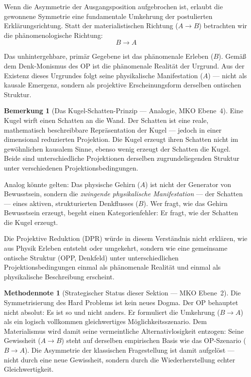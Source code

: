 \documentclass[11pt,a4paper]{article}
\theoremstyle{plain}
\theoremstyle{definition}
\newtheorem{remark}{Bemerkung}[section]
\newtheorem{methodennote}{Methodennote}[section]
\begin{document}
Wenn die Asymmetrie der Ausgangsposition aufgebrochen ist, erlaubt die gewonnene
Symmetrie eine fundamentale Umkehrung der postulierten Erkl\"{a}rungsrichtung. Statt der
materialistischen Richtung ($A \to B$) betrachten wir die ph\"{a}nomenologische Richtung:
\[
  B \to A
\]

Das unhintergehbare, prim\"{a}r Gegebene ist das ph\"{a}nomenale Erleben ($B$). Gem\"{a}\ss{}
dem Denk-Monismus des OP ist die ph\"{a}nomenale Realit\"{a}t der Urgrund. Aus der
Existenz dieses Urgrundes folgt seine physikalische Manifestation ($A$) --- nicht als
kausale Emergenz, sondern als projektive Erscheinungsform derselben ontischen Struktur.

\begin{remark}[Das Kugel-Schatten-Prinzip --- Analogie, MKO Ebene~4]
Eine Kugel wirft einen Schatten an die Wand. Der Schatten ist eine reale, mathematisch
beschreibbare Repr\"{a}sentation der Kugel --- jedoch in einer dimensional reduzierten
Projektion. Die Kugel erzeugt ihren Schatten nicht im gew\"{o}hnlichen kausalem Sinne,
ebenso wenig erzeugt der Schatten die Kugel. Beide sind unterschiedliche Projektionen
derselben zugrundeliegenden Struktur unter verschiedenen Projektionsbedingungen.

Analog k\"{o}nnte gelten: Das physische Gehirn ($A$) ist nicht der Generator von
Bewusstsein, sondern die \emph{zwingende physikalische Manifestation} --- der Schatten
--- eines aktiven, strukturierten Denkflusses ($B$). Wer fragt, wie das Gehirn Bewusstsein
erzeugt, begeht einen Kategorienfehler: Er fragt, wie der Schatten die Kugel erzeugt.

Die Projektive Reduktion (DPR) w\"{u}rde in diesem Verst\"{a}ndnis nicht erkl\"{a}ren,
wie aus Physik Erleben entsteht oder umgekehrt, sondern wie eine gemeinsame ontische
Struktur (OPP, Denkfeld) unter unterschiedlichen Projektionsbedingungen einmal als
ph\"{a}nomenale Realit\"{a}t und einmal als physikalische Beschreibung erscheint.
\end{remark}

\begin{methodennote}[Strategischer Status dieser Sektion --- MKO Ebene~2]
Die Symmetrisierung des Hard Problems ist kein neues Dogma. Der OP behauptet nicht
absolut: \glqq{}Es ist so und nicht anders.\grqq{} Er formuliert die Umkehrung
($B \to A$) als ein logisch vollkommen gleichwertiges M\"{o}glichkeitsszenario. Dem
Materialismus wird damit seine vermeintliche Alternativlosigkeit entzogen: Seine
Gewissheit ($A \to B$) steht auf derselben empirischen Basis wie das OP-Szenario
($B \to A$). Die Asymmetrie der klassischen Fragestellung ist damit aufgel\"{o}st ---
nicht durch eine neue Gewissheit, sondern durch die Wiederherstellung echter
Gleichwertigkeit.
\end{methodennote}
\end{document}
